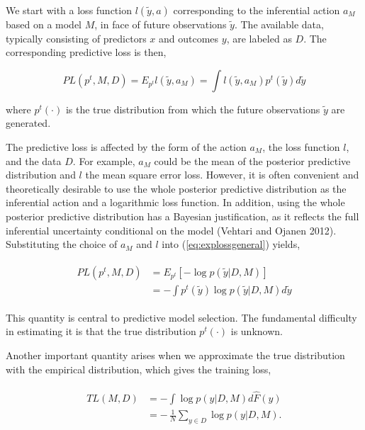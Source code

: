 \documentclass[11pt,article,oneside]{memoir}
\begin{document}
We start with a loss function \(l(\tilde y, a)\) corresponding to the
inferential action \(a_M\) based on a model \(M\), in face of future
observations \(\tilde y\). The available data, typically consisting of
predictors \(x\) and outcomes \(y\), are labeled as \(D\). The
corresponding predictive loss is then,

\begin{equation}
\label{eq:explossgeneral}
PL(p^t, M, D)=E_{p^t}l(\tilde y,
a_M)=\int l(\tilde y, a_M) p^t(\tilde y)d\tilde y
\end{equation}

\noindent where \(p^t(\cdot)\) is the true distribution from which the
future observations \(\tilde y\) are generated.

The predictive loss is affected by the form of the action \(a_M\), the
loss function \(l\), and the data \(D\). For example, \(a_M\) could be
the mean of the posterior predictive distribution and \(l\) the mean
square error loss. However, it is often convenient and theoretically
desirable to use the whole posterior predictive distribution as the
inferential action and a logarithmic loss function. In addition, using
the whole posterior predictive distribution has a Bayesian
justification, as it reflects the full inferential uncertainty
conditional on the model (Vehtari and Ojanen 2012). Substituting the
choice of \(a_M\) and \(l\) into (\ref{eq:explossgeneral}) yields,

\begin{align}
  \begin{split}
  \label{eq:logloss}
  PL(p^t, M, D)&=E_{p^t}[-\log p(\tilde y|D, M)]\\ 
  &=-\int p^t(\tilde y) \log p(\tilde y|D, M) d\tilde y
  \end{split}
  \end{align}

\noindent This quantity is central to predictive model selection. The
fundamental difficulty in estimating it is that the true distribution
\(p^t(\cdot)\) is unknown.

Another important quantity arises when we approximate the true
distribution with the empirical distribution, which gives the training
loss,

\begin{align}
  \begin{split}
  \label{eq:trloss}
  TL(M, D)&=-\int \log p(y|D, M) d\hat{F}(y)\\
  &=-\,\frac{1}{N}\sum_{y\in D}\log p(y | D, M).
  \end{split}
\end{align}
  
\end{document}
